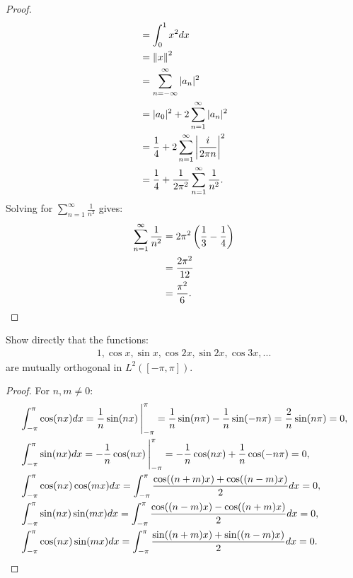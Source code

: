 \begin{proof}
\begin{equation*}
\begin{split}
                & = \int_0^1 x^2 dx \\
                & = \lnorm x \rnorm^2 \\
                & = \sum_{n = -\infty}^\infty |a_n|^2 \\
                & =|a_0|^2 + 2 \sum_{n = 1}^\infty |a_n|^2 \\
                & = \frac{1}{4} + 2 \sum_{n = 1}^\infty \left| \frac{i}{2 \pi n} \right|^2 \\
                & = \frac{1}{4} + \frac{1}{2\pi^2}\sum_{n = 1}^\infty \frac{1}{n^2}.
            \end{split}
            \end{equation*}
        Solving for $\sum_{n = 1}^\infty \frac{1}{n^2}$ gives:
            \begin{equation*}
            \begin{split}
                \sum_{n = 1}^\infty \frac{1}{n^2}
                & = 2\pi^2 \left( \frac{1}{3} - \frac{1}{4} \right) \\
                & = \frac{2\pi^2}{12} \\
                & = \frac{\pi^2}{6}. \qedhere
            \end{split}
            \end{equation*}
    \end{proof}

\begin{exercise}
Show directly that the functions:
    \begin{equation*}
    \begin{split}
        1, \cos x, \sin x, \cos 2x, \sin 2x, \cos 3x, ...
    \end{split}
    \end{equation*}
are mutually orthogonal in $L^2([-\pi,\pi])$.
\end{exercise}
\begin{proof}
    For $n,m \neq 0$:
        \begin{equation*}
        \begin{split}
            &\int_{-\pi}^{\pi}\cos (nx) dx = \frac{1}{n}\sin(nx)\h2\Bigg|_{-\pi}^{\pi} = \frac{1}{n}\sin(n \pi) - \frac{1}{n}\sin(-n\pi) = \frac{2}{n}\sin(n \pi) = 0,\\
            &\int_{-\pi}^{\pi}\sin (nx) dx = -\frac{1}{n}\cos(nx) \h2\Bigg|_{-\pi}^{\pi} = -\frac{1}{n}\cos(nx) + \frac{1}{n}\cos(-n\pi) = 0,\\
            &\int_{-\pi}^{\pi}\cos (nx) \cos (mx) dx = \int_{-\pi}^\pi \frac{\cos((n+m)x) + \cos((n-m)x)}{2}dx = 0,\\
            &\int_{-\pi}^{\pi}\sin (nx) \sin (mx) dx = \int_{-\pi}^\pi \frac{\cos((n-m)x) - \cos((n+m)x)}{2}dx = 0,\\
            &\int_{-\pi}^{\pi}\cos (nx) \sin (mx) dx= \int_{-\pi}^\pi \frac{\sin((n+m)x) + \sin((n - m)x)}{2}dx = 0. \qedhere
        \end{split}
        \end{equation*}
\end{proof}

